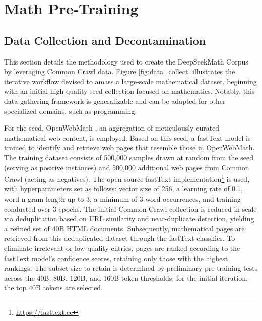 \section{Math Pre-Training}

\subsection{Data Collection and Decontamination} This section details the methodology used to create the DeepSeekMath Corpus by leveraging Common Crawl data. Figure \ref{fig:data_collect} illustrates the iterative workflow devised to amass a large-scale mathematical dataset, beginning with an initial high-quality seed collection focused on mathematics. Notably, this data gathering framework is generalizable and can be adapted for other specialized domains, such as programming.

For the seed, OpenWebMath \citep{openwebmath}, an aggregation of meticulously curated mathematical web content, is employed. Based on this seed, a fastText model \citep{joulin2016fasttext} is trained to identify and retrieve web pages that resemble those in OpenWebMath. The training dataset consists of 500,000 samples drawn at random from the seed (serving as positive instances) and 500,000 additional web pages from Common Crawl (acting as negatives). The open-source fastText implementation\footnote{\url{https://fasttext.cc}} is used, with hyperparameters set as follows: vector size of 256, a learning rate of 0.1, word n-gram length up to 3, a minimum of 3 word occurrences, and training conducted over 3 epochs. The initial Common Crawl collection is reduced in scale via deduplication based on URL similarity and near-duplicate detection, yielding a refined set of 40B HTML documents. Subsequently, mathematical pages are retrieved from this deduplicated dataset through the fastText classifier. To eliminate irrelevant or low-quality entries, pages are ranked according to the fastText model’s confidence scores, retaining only those with the highest rankings. The subset size to retain is determined by preliminary pre-training tests across the 40B, 80B, 120B, and 160B token thresholds; for the initial iteration, the top 40B tokens are selected.

